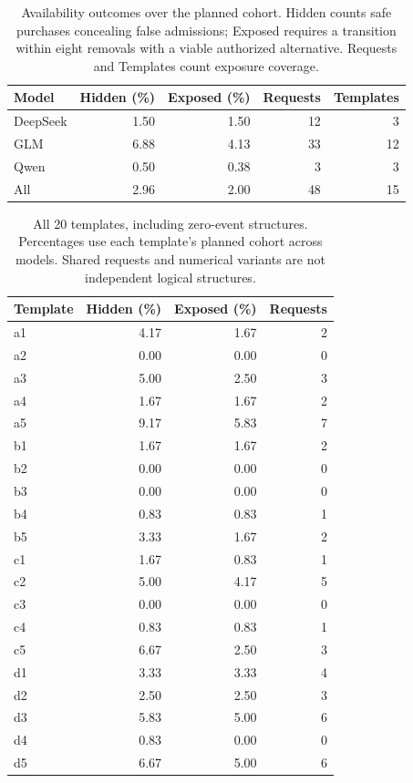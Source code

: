 \documentclass[11pt]{article}
\begin{document}
\begin{table}[!t]
\centering\small\setlength{\tabcolsep}{3pt}
\begin{tabular}{@{}lrrrr@{}}
\toprule
Model & Hidden (\%) & Exposed (\%) & Requests & Templates\\
\midrule
DeepSeek & 1.50 & 1.50 & 12 & 3\\
GLM & 6.88 & 4.13 & 33 & 12\\
Qwen & 0.50 & 0.38 & 3 & 3\\
\midrule
All & 2.96 & 2.00 & 48 & 15\\
\bottomrule
\end{tabular}
\caption{Availability outcomes over the planned cohort. Hidden counts safe purchases concealing false admissions; Exposed requires a transition within eight removals with a viable authorized alternative. Requests and Templates count exposure coverage.}
\label{tab:availability-models}
\end{table}

\begin{table}[t]
\centering\small\setlength{\tabcolsep}{3pt}
\begin{tabular}{@{}lrrr@{}}
\toprule
Template & Hidden (\%) & Exposed (\%) & Requests\\
\midrule
a1 & 4.17 & 1.67 & 2\\
a2 & 0.00 & 0.00 & 0\\
a3 & 5.00 & 2.50 & 3\\
a4 & 1.67 & 1.67 & 2\\
a5 & 9.17 & 5.83 & 7\\
\midrule
b1 & 1.67 & 1.67 & 2\\
b2 & 0.00 & 0.00 & 0\\
b3 & 0.00 & 0.00 & 0\\
b4 & 0.83 & 0.83 & 1\\
b5 & 3.33 & 1.67 & 2\\
\midrule
c1 & 1.67 & 0.83 & 1\\
c2 & 5.00 & 4.17 & 5\\
c3 & 0.00 & 0.00 & 0\\
c4 & 0.83 & 0.83 & 1\\
c5 & 6.67 & 2.50 & 3\\
\midrule
d1 & 3.33 & 3.33 & 4\\
d2 & 2.50 & 2.50 & 3\\
d3 & 5.83 & 5.00 & 6\\
d4 & 0.83 & 0.00 & 0\\
d5 & 6.67 & 5.00 & 6\\
\bottomrule
\end{tabular}
\caption{All 20 templates, including zero-event structures. Percentages use each template's planned cohort across models. Shared requests and numerical variants are not independent logical structures.}
\label{tab:availability-templates}
\end{table}
\end{document}
